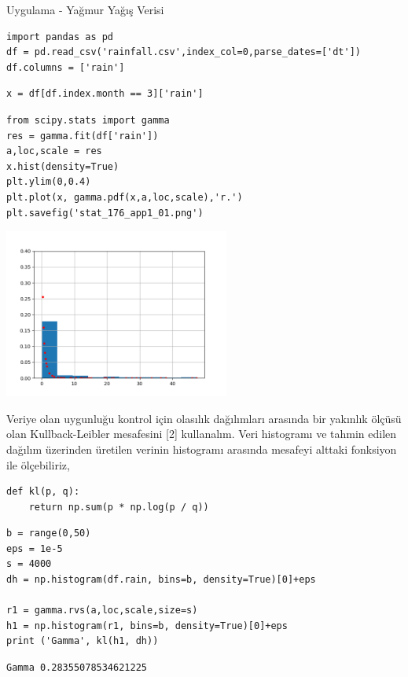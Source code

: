 \documentclass[12pt,fleqn]{article}\usepackage{../../common}
\begin{document}
Uygulama - Yağmur Yağış Verisi

\begin{verbatim}
import pandas as pd
df = pd.read_csv('rainfall.csv',index_col=0,parse_dates=['dt'])
df.columns = ['rain']
\end{verbatim}

\begin{verbatim}
x = df[df.index.month == 3]['rain']
\end{verbatim}

\begin{verbatim}
from scipy.stats import gamma
res = gamma.fit(df['rain'])
a,loc,scale = res  
x.hist(density=True)
plt.ylim(0,0.4)
plt.plot(x, gamma.pdf(x,a,loc,scale),'r.')
plt.savefig('stat_176_app1_01.png')
\end{verbatim}

\includegraphics[width=20em]{stat_176_app1_01.png}

Veriye olan uygunluğu kontrol için olasılık dağılımları arasında bir yakınlık
ölçüsü olan Kullback-Leibler mesafesini [2] kullanalım. Veri histogramı ve
tahmin edilen dağılım üzerinden üretilen verinin histogramı arasında mesafeyi
alttaki fonksiyon ile ölçebiliriz,

\begin{verbatim}
def kl(p, q):
    return np.sum(p * np.log(p / q))    
\end{verbatim}

\begin{verbatim}
b = range(0,50)
eps = 1e-5
s = 4000
dh = np.histogram(df.rain, bins=b, density=True)[0]+eps

r1 = gamma.rvs(a,loc,scale,size=s)
h1 = np.histogram(r1, bins=b, density=True)[0]+eps
print ('Gamma', kl(h1, dh))
\end{verbatim}

\begin{verbatim}
Gamma 0.28355078534621225
\end{verbatim}
\end{document}
